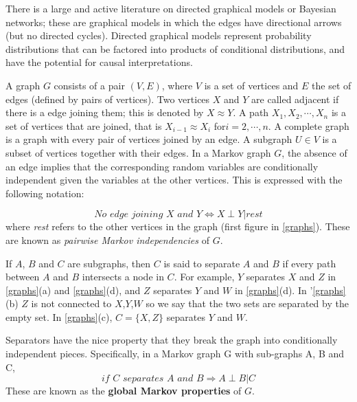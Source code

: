 \documentclass[12pt, letterpaper]{article}
\theoremstyle{definition}
\begin{document}
There is a large and active literature on directed graphical models or Bayesian networks; these are graphical models in which the edges have directional arrows (but no directed cycles). Directed graphical models represent probability distributions that can be factored into products of conditional distributions, and have the potential for causal interpretations.

 A graph $G$ consists of a pair $(V, E)$, where $V$ is a set of vertices and $E$ the set of edges (defined by pairs of vertices). Two vertices $X$ and $Y$ are called adjacent if there is a edge joining them; this is denoted by $X \approx Y$. A path $X_1,X_2,\cdots,X_n$ is a set of vertices that are joined, that is $X_{i-1} \approx X_i$ for$ i = 2,\cdots,n$. A complete graph is a graph with every pair of vertices joined by an edge. A subgraph $U \in V$ is a subset of vertices together with their edges.
In a Markov graph $G$, the absence of an edge implies that the corresponding random variables are conditionally independent given the variables at the other vertices. This is expressed with the following notation:

\begin{equation}
\textit{No edge joining $X$ and $Y$} \Longleftrightarrow  X \perp Y|rest
\end{equation}
where \textit{rest} refers to the other vertices in the graph (first figure in \autoref{graphs}). These are known as \textit{pairwise Markov independencies} of $G$.

If $A$, $B$ and $C$ are subgraphs, then $C$ is said to separate $A$ and $B$ if every path between $A$ and $B$ intersects a node in $C$. For example, $Y$ separates $X$ and $Z$ in \autoref{graphs}(a) and \autoref{graphs}(d), and $Z$ separates $Y$ and $W$ in \autoref{graphs}(d). In '\autoref{graphs}(b) $Z$ is not connected to $X$,$Y$,$W$ so we say that the two sets are separated by the empty set. In \autoref{graphs}(c), $C = \{X,Z\}$ separates $Y$ and $W$.

Separators have the nice property that they break the graph into conditionally independent pieces. Specifically, in a Markov graph G with sub-graphs A, B and C,
\begin{equation}
\textit{if $C$ separates $A$ and $B$} \Rightarrow A\perp B|C
\end{equation}
These are known as the \textbf{global Markov properties} of $G$.
\end{document}
